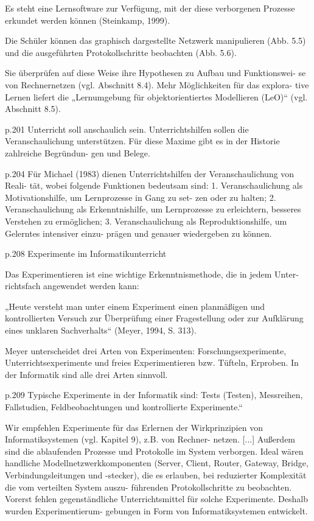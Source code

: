 Es steht eine Lernsoftware zur Verfügung, mit der diese verborgenen Prozesse 
erkundet werden können (Steinkamp, 1999). 
 
Die  Schüler  können  das  graphisch  dargestellte  Netzwerk  manipulieren  (Abb. 
5.5) und die ausgeführten Protokollschritte beobachten (Abb. 5.6). 

Sie überprüfen auf diese Weise ihre Hypothesen zu Aufbau und Funktionswei-
se von Rechnernetzen (vgl. Abschnitt 8.4). Mehr Möglichkeiten für das explora-
tive  Lernen  liefert  die  „Lernumgebung  für  objektorientiertes  Modellieren 
(LeO)“ (vgl. Abschnitt 8.5). 

p.201
Unterricht soll anschaulich sein. Unterrichtshilfen sollen die Veranschaulichung 
unterstützen. Für diese Maxime gibt es in der Historie zahlreiche Begründun-
gen und Belege. 

p.204
Für Michael (1983) dienen Unterrichtshilfen der Veranschaulichung von Reali-
tät, wobei folgende Funktionen bedeutsam sind: 
1.  Veranschaulichung als Motivationshilfe, um Lernprozesse in Gang zu set-
zen oder zu halten; 
2.  Veranschaulichung  als  Erkenntnishilfe,  um  Lernprozesse  zu  erleichtern, 
besseres Verstehen zu ermöglichen; 
3.  Veranschaulichung als Reproduktionshilfe, um Gelerntes intensiver einzu-
prägen und genauer wiedergeben zu können. 

p.208
Experimente im Informatikunterricht 

Das Experimentieren ist eine wichtige Erkenntnismethode, die in jedem Unter-
richtsfach angewendet werden kann:  

„Heute  versteht  man  unter  einem  Experiment  einen  planmäßigen  und  kontrollierten 
Versuch  zur  Überprüfung  einer  Fragestellung  oder  zur  Aufklärung  eines  unklaren 
Sachverhalts“ (Meyer, 1994, S. 313). 

Meyer  unterscheidet  drei  Arten  von  Experimenten:  Forschungsexperimente, 
Unterrichtsexperimente und freies Experimentieren bzw. Tüfteln, Erproben. In 
der Informatik sind alle drei Arten sinnvoll. 

p.209
  Typische  Experimente  in  der  Informatik  sind:  Tests  (Testen), 
Messreihen,  Fallstudien,  Feldbeobachtungen  und  kontrollierte  Experimente.“ 

 Wir empfehlen Experimente für das Erlernen 
der Wirkprinzipien von Informatiksystemen (vgl. Kapitel 9), z.B. von Rechner-
netzen. [...]
Außerdem sind die ablaufenden Prozesse und Protokolle 
im  System  verborgen.  Ideal  wären  handliche  Modellnetzwerkkomponenten 
(Server, Client, Router, Gateway, Bridge, Verbindungsleitungen und -stecker), 
die es erlauben, bei reduzierter Komplexität die vom verteilten System auszu-
führenden  Protokollschritte  zu  beobachten.  Vorerst  fehlen  gegenständliche 
Unterrichtsmittel für solche Experimente. Deshalb wurden Experimentierum-
gebungen in Form von Informatiksystemen entwickelt.  

